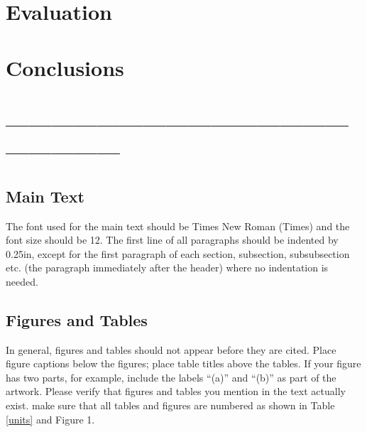 \documentclass[12pt,a4paper]{article}
\begin{document}
\iffalse
#################################################################################
\fi

\section{Evaluation}

\iffalse
This section should between 1 to 2 pages in length.
\fi



\iffalse
#################################################################################
\fi

\section{Conclusions}

\iffalse
This section summarises the main points of this paper.  Do not replicate the abstract as the conclusion.  A conclusion might elaborate on the importance of the work or suggest applications and extensions.  This section should be no more than 1 page in length.
\fi



\iffalse
#################################################################################
\fi

\iffalse
\section*{------------------------------------------------------------}

\subsection{Main Text}

The font used for the main text should be Times New Roman (Times) and the font size should be 12.  The first line of all paragraphs should be indented by 0.25in, except for the first paragraph of each section, subsection, subsubsection etc. (the paragraph immediately after the header) where no indentation is needed.

\subsection{Figures and Tables}
In general, figures and tables should not appear before they are cited.  Place figure captions below the figures; place table titles above the tables.  If your figure has two parts, for example, include the labels ``(a)'' and ``(b)'' as part of the artwork.  Please verify that figures and tables you mention in the text actually exist.  make sure that all tables and figures are numbered as shown in Table \ref{units} and Figure 1.
\end{document}
